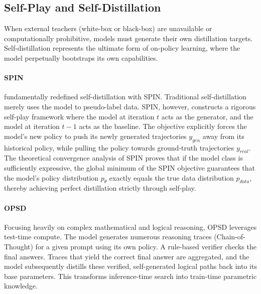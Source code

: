 \documentclass{article} %
\begin{document}
\subsection{Self-Play and Self-Distillation}
\label{subsec:self_distill}

When external teachers (white-box or black-box) are unavailable or computationally prohibitive, models must generate their own distillation targets. Self-distillation represents the ultimate form of on-policy learning, where the model perpetually bootstraps its own capabilities.

\paragraph{SPIN}
\citet{2401.01335} fundamentally redefined self-distillation with SPIN. Traditional self-distillation merely uses the model to pseudo-label data. SPIN, however, constructs a rigorous self-play framework where the model at iteration $t$ acts as the generator, and the model at iteration $t-1$ acts as the baseline. The objective explicitly forces the model's new policy to push its newly generated trajectories $y_{gen}$ away from its historical policy, while pulling the policy towards ground-truth trajectories $y_{real}$. 
The theoretical convergence analysis of SPIN proves that if the model class is sufficiently expressive, the global minimum of the SPIN objective guarantees that the model's policy distribution $p_\theta$ exactly equals the true data distribution $p_{data}$, thereby achieving perfect distillation strictly through self-play.

\paragraph{OPSD}
Focusing heavily on complex mathematical and logical reasoning, OPSD \citep{2601.18734} leverages test-time compute. The model generates numerous reasoning traces (Chain-of-Thought) for a given prompt using its own policy. A rule-based verifier checks the final answers. Traces that yield the correct final answer are aggregated, and the model subsequently distills these verified, self-generated logical paths back into its base parameters. This transforms inference-time search into train-time parametric knowledge.
\end{document}
